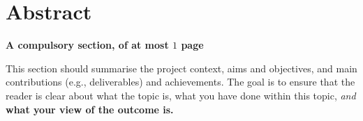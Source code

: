 \documentclass{dissertation}
\begin{document}



\maketitle


\frontmatter


\makedecl


\tableofcontents
\listoffigures
\listoftables
\listofalgorithms



\chapter*{Abstract}

{\bf A compulsory section, of at most $1$ page} 
\vspace{1cm} 

\noindent
This section should summarise the project context, aims and objectives,
and main contributions (e.g., deliverables) and achievements.  The goal is to ensure that the 
reader is clear about what the topic is, what you have done within this 
topic, {\em and}\/ {\bf what your view of the outcome is.}
\end{document}
